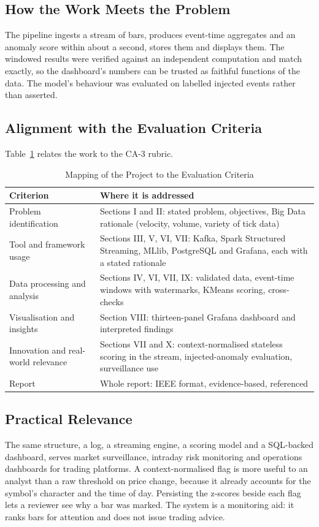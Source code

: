 \documentclass[conference]{IEEEtran}
\begin{document}
\subsection{How the Work Meets the Problem}
The pipeline ingests a stream of bars, produces event-time aggregates and an anomaly score within about a second, stores them and displays them. The windowed results were verified against an independent computation and match exactly, so the dashboard's numbers can be trusted as faithful functions of the data. The model's behaviour was evaluated on labelled injected events rather than asserted.

\subsection{Alignment with the Evaluation Criteria}
Table~\ref{tab:criteria} relates the work to the CA-3 rubric.

\begin{table}[t]
\caption{Mapping of the Project to the Evaluation Criteria}
\label{tab:criteria}
\centering
\small
\begin{tabular}{@{}p{2.4cm}p{5.4cm}@{}}
\toprule
Criterion & Where it is addressed \\
\midrule
Problem identification & Sections I and II: stated problem, objectives, Big Data rationale (velocity, volume, variety of tick data) \\
Tool and framework usage & Sections III, V, VI, VII: Kafka, Spark Structured Streaming, MLlib, PostgreSQL and Grafana, each with a stated rationale \\
Data processing and analysis & Sections IV, VI, VII, IX: validated data, event-time windows with watermarks, KMeans scoring, cross-checks \\
Visualisation and insights & Section VIII: thirteen-panel Grafana dashboard and interpreted findings \\
Innovation and real-world relevance & Sections VII and X: context-normalised stateless scoring in the stream, injected-anomaly evaluation, surveillance use \\
Report & Whole report: IEEE format, evidence-based, referenced \\
\bottomrule
\end{tabular}
\end{table}

\subsection{Practical Relevance}
The same structure, a log, a streaming engine, a scoring model and a SQL-backed dashboard, serves market surveillance, intraday risk monitoring and operations dashboards for trading platforms. A context-normalised flag is more useful to an analyst than a raw threshold on price change, because it already accounts for the symbol's character and the time of day. Persisting the z-scores beside each flag lets a reviewer see why a bar was marked. The system is a monitoring aid: it ranks bars for attention and does not issue trading advice.
\end{document}
